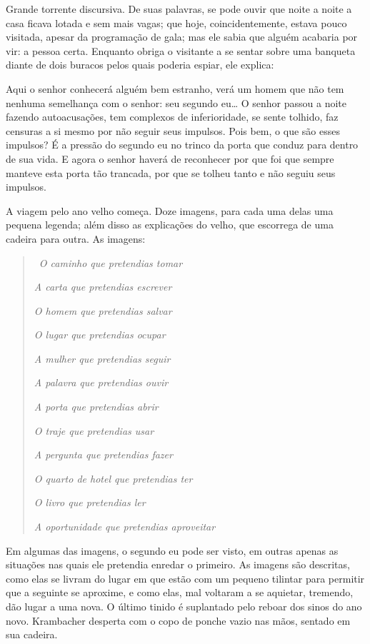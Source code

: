 Grande torrente discursiva. De suas palavras, se pode ouvir que noite a
noite a casa ficava lotada e sem mais vagas; que hoje, coincidentemente,
estava pouco visitada, apesar da programação de gala; mas ele sabia que
alguém acabaria por vir: a pessoa certa. Enquanto obriga o visitante a
se sentar sobre uma banqueta diante de dois buracos pelos quais poderia
espiar, ele explica:

Aqui o senhor conhecerá alguém bem estranho, verá um homem que não tem
nenhuma semelhança com o senhor: seu segundo eu\ldots{} O senhor passou a
noite fazendo autoacusações, tem complexos de inferioridade, se sente
tolhido, faz censuras a si mesmo por não seguir seus impulsos. Pois bem,
o que são esses impulsos? É a pressão do segundo eu no trinco da porta
que conduz para dentro de sua vida. E agora o senhor haverá de
reconhecer por que foi que sempre manteve esta porta tão trancada,
por que se tolheu tanto e não seguiu seus impulsos.

A viagem pelo ano velho começa. Doze imagens, para cada uma delas uma
pequena legenda; além disso as explicações do velho, que escorrega de
uma cadeira para outra. As imagens:

\begin{quote}
\quad\,
\emph{O caminho que pretendias tomar }

\emph{A carta que pretendias escrever }

\emph{O homem que pretendias salvar }

\emph{O lugar que pretendias ocupar }

\emph{A mulher que pretendias seguir }

\emph{A palavra que pretendias ouvir }

\emph{A porta que pretendias abrir }

\emph{O traje que pretendias usar }

\emph{A pergunta que pretendias fazer }

\emph{O quarto de hotel que pretendias ter }

\emph{O livro que pretendias ler }

\emph{A oportunidade que pretendias aproveitar }
\end{quote}

Em algumas das imagens, o segundo eu pode ser visto, em outras apenas as
situações nas quais ele pretendia enredar o primeiro. As imagens são
descritas, como elas se livram do lugar em que estão com um pequeno
tilintar para permitir que a seguinte se aproxime, e como elas, mal
voltaram a se aquietar, tremendo, dão lugar a uma nova. O último tinido
é suplantado pelo reboar dos sinos do ano novo. Krambacher desperta com
o copo de ponche vazio nas mãos, sentado em sua cadeira.

